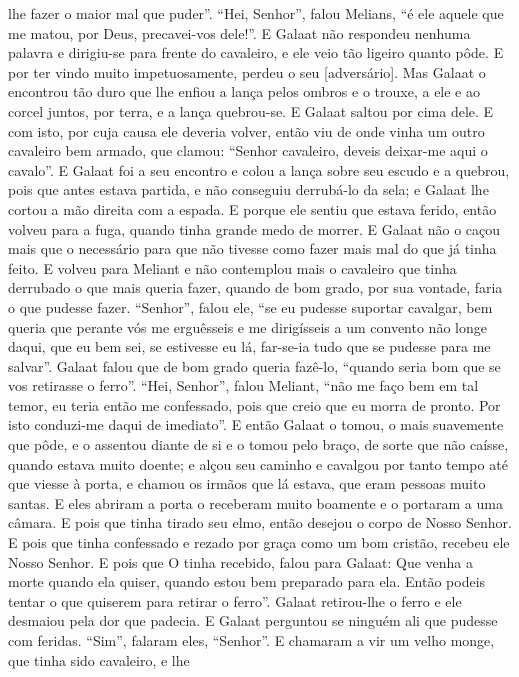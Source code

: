 lhe fazer o maior mal que puder”. “Hei, Senhor”, falou Melians, “é ele aquele
que me matou, por Deus, precavei-vos dele!”. E Galaat não respondeu nenhuma
palavra e dirigiu-se para frente do cavaleiro, e ele veio tão ligeiro quanto
pôde. E por ter vindo muito impetuosamente, perdeu o seu [adversário]. Mas
Galaat o encontrou tão duro que lhe enfiou a lança pelos ombros e o trouxe, a
ele e ao corcel juntos, por terra, e a lança quebrou-se. E Galaat saltou por
cima dele. E com isto, por cuja causa ele deveria volver, então viu de onde
vinha um outro cavaleiro bem armado, que clamou: “Senhor cavaleiro, deveis
deixar-me aqui o cavalo”. E Galaat foi a seu encontro e colou a lança sobre seu
escudo e a quebrou, pois que antes estava partida, e não conseguiu derrubá-lo
da sela; e Galaat lhe cortou a mão direita com a espada. E porque ele sentiu
que estava ferido, então volveu para a fuga, quando tinha grande medo de
morrer. E Galaat não o caçou mais que o necessário para que não tivesse como
fazer mais mal do que já tinha feito. E volveu para Meliant e não contemplou
mais o cavaleiro que tinha derrubado o que mais queria fazer, quando de bom
grado, por sua vontade, faria o que pudesse fazer. “Senhor”, falou ele, “se eu
pudesse suportar cavalgar, bem queria que perante vós me erguêsseis e me
dirigísseis a um convento não longe daqui, que eu bem sei, se estivesse eu lá,
far-se-ia tudo que se pudesse para me salvar”. Galaat falou que de bom grado
queria fazê-lo, “quando seria bom que se vos retirasse o ferro”. “Hei, Senhor”,
falou Meliant, “não me faço bem em tal temor, eu teria então me confessado,
pois que creio que eu morra de pronto. Por isto conduzi-me daqui de imediato”.
E então Galaat o tomou, o mais suavemente que pôde, e o assentou diante de si e
o tomou pelo braço, de sorte que não caísse, quando estava muito doente; e
alçou seu caminho e cavalgou por tanto tempo até que viesse à porta, e chamou
os irmãos que lá estava, que eram pessoas muito santas. E eles abriram a porta
o receberam muito boamente e o portaram a uma câmara. E pois que tinha tirado
seu elmo, então desejou o corpo de Nosso Senhor. E pois que tinha confessado e
rezado por graça como um bom cristão, recebeu ele Nosso Senhor. E pois que O
tinha recebido, falou para Galaat: Que venha a morte quando ela quiser, quando
estou bem preparado para ela. Então podeis tentar o que quiserem para retirar o
ferro”. Galaat retirou-lhe o ferro e ele desmaiou pela dor que padecia. E
Galaat perguntou se ninguém ali que pudesse com feridas. “Sim”, falaram eles,
“Senhor”. E chamaram a vir um velho monge, que tinha sido cavaleiro, e lhe
